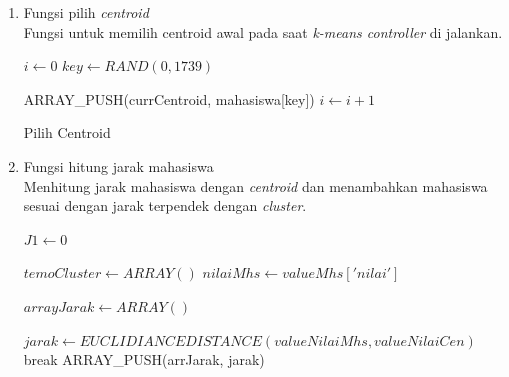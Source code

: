 \begin{enumerate}
    \item Fungsi pilih \textit{centroid} \\
        Fungsi untuk memilih centroid awal pada saat \textit{k-means controller} di jalankan.\\
        
        \begin{algorithm}[H]
            \begin{algorithmic}[1]
                    \State $i \gets 0$
                        \State $key \gets RAND(0,1739)$ 
                        
                                \State ARRAY\_PUSH(currCentroid, mahasiswa[key])
                                \State $i \gets i+1$
                            \EndIf
                        \EndIf
                    \EndWhile
                \EndProcedure
            \end{algorithmic} 
            \caption{Pilih Centroid}
            \label{alg:pilih centroid}
        \end{algorithm}
    
    \item Fungsi hitung jarak mahasiswa \\
        Menhitung jarak mahasiswa dengan \textit{centroid} dan menambahkan mahasiswa sesuai dengan jarak terpendek dengan \textit{cluster}.\\
        
        \begin{algorithm}[H]
            \begin{algorithmic}[1]
                    \State $J1 \gets 0$
                    
                        \State $temoCluster \gets ARRAY()$ 
                        \State $nilaiMhs \gets valueMhs['nilai']$
                        
                            \State $arrayJarak \gets ARRAY()$
                            
                                    \State $jarak \gets EUCLIDIANCEDISTANCE(valueNilaiMhs, valueNilaiCen)$
                                    \State break
                                \EndIf
                            \EndFor
                            \State ARRAY\_PUSH(arrJarak, jarak)
                        \EndFor
                        

\end{algorithmic}
\end{algorithm}
\end{enumerate}
